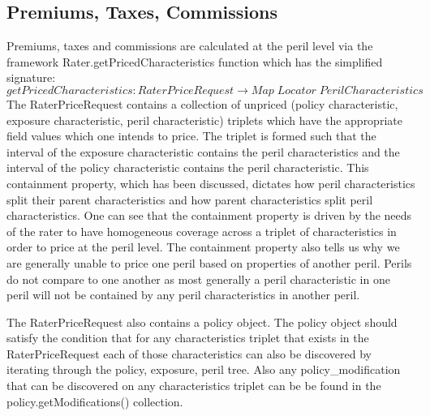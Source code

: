 
\subsection{Premiums, Taxes, Commissions}
Premiums, taxes and commissions are calculated at the peril level via the framework Rater.getPricedCharacteristics function
which has the simplified signature:
\begin{equation*}
  getPricedCharacteristics: RaterPriceRequest \to Map \; Locator \; PerilCharacteristics
\end{equation*}
The RaterPriceRequest contains a collection of unpriced (policy characteristic, exposure characteristic, peril characteristic) triplets
which have the appropriate field values which one intends to price. The triplet is formed such that the interval of the
exposure characteristic contains the peril characteristics and the interval of the policy characteristic contains the
peril characteristic. This containment property, which has been discussed, dictates how peril characteristics split
their parent characteristics and how parent characteristics split peril characteristics. One can see that the containment property
is driven by the needs of the rater to have homogeneous coverage across a triplet of characteristics in order to price at the peril
level. The containment property also tells us why we are generally unable to price one peril based on properties of another peril.
Perils do not compare to one another as most generally a peril characteristic in one peril will not be contained by any
peril characteristics in another peril.

The RaterPriceRequest also contains a policy object. The policy object should satisfy the condition that for any
characteristics triplet that exists in the RaterPriceRequest each of those characteristics can also be discovered by
iterating through the policy, exposure, peril tree. Also any policy\_modification that can be discovered on any
characteristics triplet can be be found in the policy.getModifications() collection.

